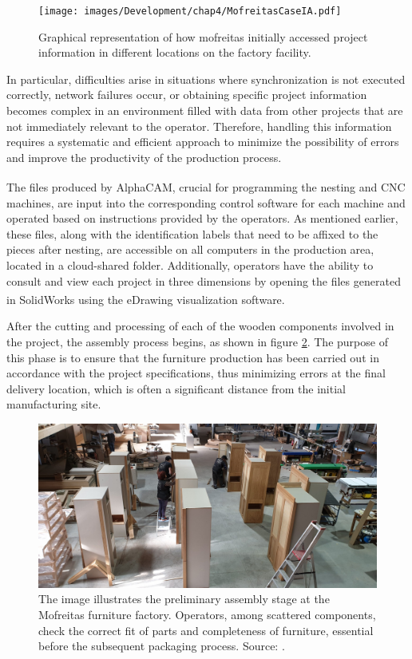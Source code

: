 \begin{figure}[ht!]
    \centering
    \texttt{[image: images/Development/chap4/MofreitasCaseIA.pdf]}
    \caption{Graphical representation of how mofreitas initially accessed project information in different locations on the factory facility.}
    \label{fig:dataSharing}
\end{figure}

In particular, difficulties arise in situations where synchronization is not executed correctly, network failures occur, or obtaining specific project information becomes complex in an environment filled with data from other projects that are not immediately relevant to the operator. Therefore, handling this information requires a systematic and efficient approach to minimize the possibility of errors and improve the productivity of the production process.

The files produced by AlphaCAM\textsuperscript{\textregistered}, crucial for programming the nesting and CNC machines, are input into the corresponding control software for each machine and operated based on instructions provided by the operators. As mentioned earlier, these files, along with the identification labels that need to be affixed to the pieces after nesting, are accessible on all computers in the production area, located in a cloud-shared folder. Additionally, operators have the ability to consult and view each project in three dimensions by opening the files generated in SolidWorks\textsuperscript{\textregistered} using the eDrawing\textsuperscript{\textregistered} visualization software.


After the cutting and processing of each of the wooden components involved in the project, the assembly process begins, as shown in figure \ref{fig:shopFloor}. The purpose of this phase is to ensure that the furniture production has been carried out in accordance with the project specifications, thus minimizing errors at the final delivery location, which is often a significant distance from the initial manufacturing site.


\begin{figure}[ht!]
    \centering
    \includegraphics[width=.65\linewidth]{images/Development/chap4/mofreitas.png}
    \caption{The image illustrates the preliminary assembly stage at the Mofreitas furniture factory. Operators, among scattered components, check the correct fit of parts and completeness of furniture, essential before the subsequent packaging process. Source: \cite{noauthor_mofreita_2020}.}
    \label{fig:shopFloor}
\end{figure}


